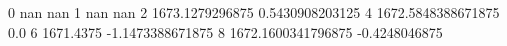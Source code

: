 0 nan nan
1 nan nan
2 1673.1279296875 0.5430908203125
4 1672.5848388671875 0.0
6 1671.4375 -1.1473388671875
8 1672.1600341796875 -0.4248046875

